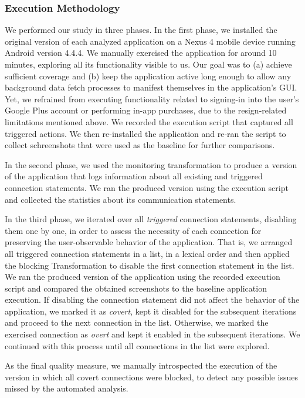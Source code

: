 \subsubsection{Execution Methodology}
We performed our study in three phases. In the first phase, 
we installed the original version of each analyzed 
application on a Nexus 4 mobile device running Android version 4.4.4.
We manually exercised the application for around 10 minutes, exploring all its functionality visible to us. Our goal was to (a) achieve sufficient coverage and (b) keep the application active long enough to allow any background data fetch processes to manifest themselves in the application's GUI. 
Yet, we refrained from executing functionality related to signing-in into the user's Google Plus account or performing in-app purchases, due to the resign-related limitations mentioned above.
We recorded the execution script that captured all triggered actions. 
We then re-installed the application %
and re-ran the script to collect schreenshots that were used as the baseline for further comparisons. 

In the second phase, we used the monitoring transformation to produce a version of the %
application that logs information about all existing and triggered connection statements. We ran the produced version using the execution script and collected the statistics about its communication statements.  

In the third phase, we iterated over all \emph{triggered} connection statements, disabling them one by one, in order to assess
the necessity of each connection for preserving the user-observable behavior of the application. 
That is, we arranged all triggered connection statements in a list, in a lexical order and then applied the blocking Transformation to disable the first connection statement in the list.   
We ran the produced version of the application using the recorded execution script and compared the obtained screenshots to the baseline application execution. If disabling the connection statement did not affect the behavior of the application, we marked it as \emph{covert}, kept it disabled for the subsequent iterations and proceed to the next connection in the list.
Otherwise, we marked the exercised connection as \emph{overt} and kept it enabled in the subsequent iterations.
We continued with this process until all connections in the list were explored.

As the final quality measure, we manually introspected the execution of the version in which all covert connections
were blocked, to detect any  possible issues missed by the automated analysis.

